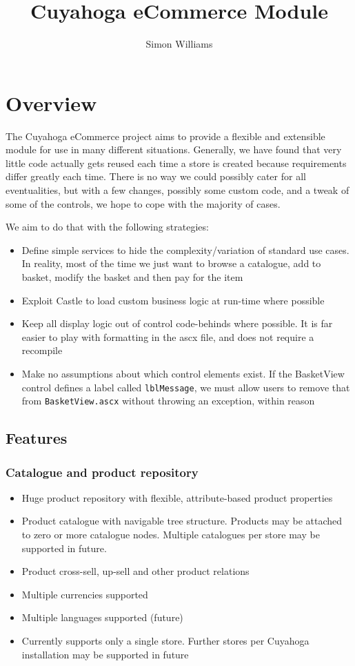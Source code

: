 \documentclass[12pt]{article}
\author{Simon Williams}
\title{Cuyahoga eCommerce Module}
\begin{document}
\section{Overview}
The Cuyahoga eCommerce project aims to provide a flexible and extensible module for use in many different situations. Generally, we have found that very little code actually gets reused each time a store is created because requirements differ greatly each time. There is no way we could possibly cater for all eventualities, but with a few changes, possibly some custom code, and a tweak of some of the controls, we hope to cope with the majority of cases.

We aim to do that with the following strategies:
\begin{itemize}
	\item Define simple services to hide the complexity/variation of standard use cases. In reality, most of the time we just want to browse a catalogue, add to basket, modify the basket and then pay for the item
	\item Exploit Castle to load custom business logic at run-time where possible
	\item Keep all display logic out of control code-behinds where possible. It is far easier to play with formatting in the ascx file, and does not require a recompile
	\item Make no assumptions about which control elements exist. If the BasketView control defines a label called \texttt{lblMessage}, we must allow users to remove that from \texttt{BasketView.ascx} without throwing an exception, within reason
\end{itemize}

\subsection{Features}
\subsubsection{Catalogue and product repository}
\begin{itemize}
	\item Huge product repository with flexible, attribute-based product properties
	\item Product catalogue with navigable tree structure. Products may be attached to zero or more catalogue nodes. Multiple catalogues per store may be supported in future.
	\item Product cross-sell, up-sell and other product relations
	\item Multiple currencies supported
	\item Multiple languages supported (future)
	\item Currently supports only a single store. Further stores per Cuyahoga installation may be supported in future
\end{itemize}
\end{document}
